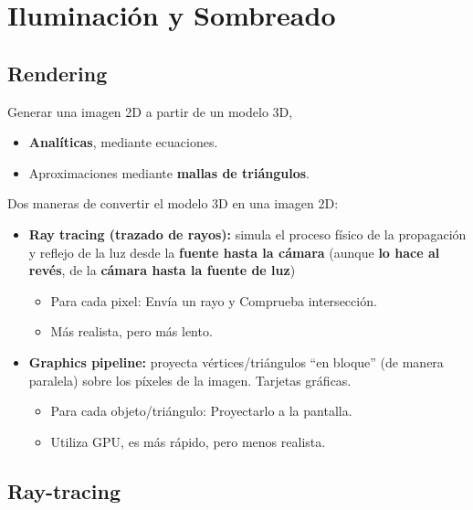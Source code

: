 \chapter{Iluminación y Sombreado}
\section{Rendering}
Generar una imagen 2D a partir de un modelo 3D,
\begin{itemize}
	\item \textbf{Analíticas}, mediante ecuaciones.
	\item Aproximaciones mediante \textbf{mallas de triángulos}.
\end{itemize}

Dos maneras de convertir el modelo 3D en una imagen 2D:
\begin{itemize}
	\item \textbf{Ray tracing (trazado de rayos):} simula el proceso físico de la propagación y reflejo de la luz desde la \textbf{fuente hasta la cámara} (aunque \textbf{lo hace al revés}, de la \textbf{cámara hasta la fuente de luz})
	      \begin{itemize}
		      \item Para cada pixel: Envía un rayo y Comprueba intersección.
		      \item Más realista, pero más lento.
	      \end{itemize}
	\item \textbf{Graphics pipeline:} proyecta vértices/triángulos \enquote{en bloque} (de manera paralela) sobre los píxeles de la imagen. Tarjetas gráficas.
	      \begin{itemize}
		      \item Para cada objeto/triángulo: Proyectarlo a la pantalla.
		      \item Utiliza GPU, es más rápido, pero menos realista.
	      \end{itemize}
\end{itemize}

\section{Ray-tracing}
